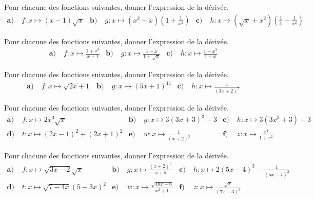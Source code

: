 \documentclass[11pt]{article}
\begin{document}
\vspace{2cm}
\setcounter{exo}{0}

\begin{exo}[Produits]
  Pour chacune des fonctions suivantes, donner l'expression de la dérivée.
  \begin{align*}
    \textbf{a)}\;& f:x\mapsto (x-1)\sqrt x &
    \textbf{b)}\;& g:x\mapsto (x^2-x)\left( 1+\frac{1}{x^2} \right) &
    \textbf{c)}\;& h:x\mapsto (\sqrt x + x^2)\left( \frac{1}{x}+\frac{1}{x^2} \right)
  \end{align*}
\end{exo}

\begin{exo}[Quotients]
  Pour chacune des fonctions suivantes, donner l'expression de la dérivée.
  \begin{align*}
    \textbf{a)}\;& f:x\mapsto \frac{1+x^4}{x+1} &
    \textbf{b)}\;& g:x\mapsto \frac{1-x}{1+\sqrt x} &
    \textbf{c)}\;& h:x\mapsto \frac{1-x^3}{1-x}
  \end{align*}
\end{exo}

\begin{exo}[Compositions]
  Pour chacune des fonctions suivantes, donner l'expression de la dérivée.
  \begin{align*}
    \textbf{a)}\;& f:x\mapsto \sqrt{2x+1} &
    \textbf{b)}\;& g:x\mapsto (5x+1)^{11} &
    \textbf{c)}\;& h:x\mapsto \frac{1}{(3x+2)^7}
  \end{align*}
\end{exo}

\begin{exo}
  Pour chacune des fonctions suivantes, donner l'expression de la dérivée.
  \begin{align*}
    \textbf{a)}\;& f:x\mapsto 2x^3\sqrt{x} &
    \textbf{b)}\;& g:x\mapsto 3(3x+3)^3+3 &
    \textbf{c)}\;& h:x\mapsto 3(3x^3+3)+3 \\
    \textbf{d)}\;& t:x\mapsto (2x-1)^2+(2x+1)^2 &
    \textbf{e)}\;& w:x\mapsto \frac{1}{(x+2)^3} &
    \textbf{f)}\;& z:x\mapsto \frac{x^4}{1+x^2}
  \end{align*}
\end{exo}

\begin{exo}[$\star\star\star$]
  Pour chacune des fonctions suivantes, donner l'expression de la dérivée.
  \begin{align*}
    \textbf{a)}\;& f:x\mapsto \sqrt{3x-2}\sqrt{x} &
    \textbf{b)}\;& g:x\mapsto \frac{(x+2)^3}{x+5} &
    \textbf{c)}\;& h:x\mapsto 2(5x-4)^3-\frac{1}{(5x-4)^2} \\
    \textbf{d)}\;& t:x\mapsto \sqrt{7-4x}(5-3x)^2 &
    \textbf{e)}\;& w:x\mapsto \frac{\sqrt{10x-6}}{x^2+1} &
    \textbf{f)}\;& z:x\mapsto \frac{\sqrt x}{(7x-3)^3} \\
  \end{align*}
\end{exo}
\end{document}
